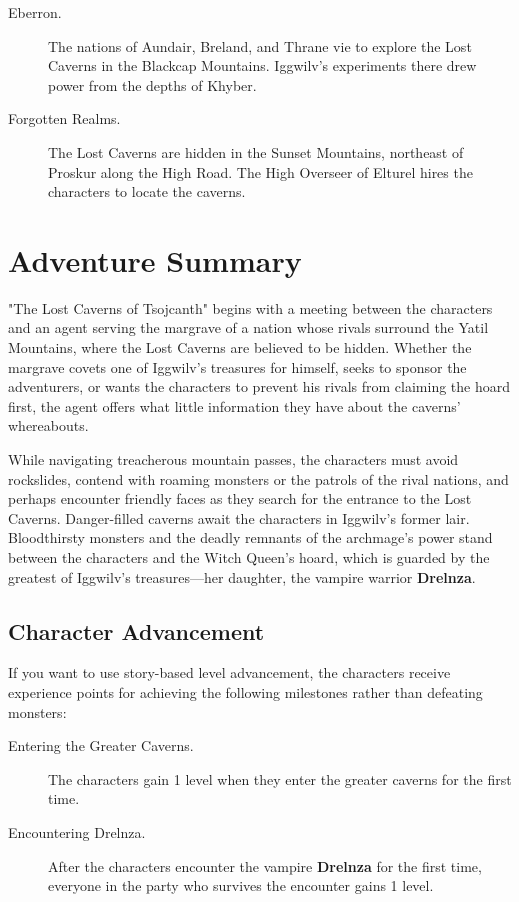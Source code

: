 \documentclass[10pt,a4paper,twoside,bg=print,twocolumn,openany,nodeprecatedcode]{dndbook}
\begin{document}
\begin{description}
\item[Eberron.]
The nations of Aundair, Breland, and Thrane vie to explore the Lost Caverns in the Blackcap Mountains. Iggwilv's experiments there drew power from the depths of Khyber.
\item[Forgotten Realms.]
The Lost Caverns are hidden in the Sunset Mountains, northeast of Proskur along the High Road. The High Overseer of Elturel hires the characters to locate the caverns.
\end{description}

\section{Adventure Summary}
"The Lost Caverns of Tsojcanth" begins with a meeting between the characters and an agent serving the margrave of a nation whose rivals surround the Yatil Mountains, where the Lost Caverns are believed to be hidden. Whether the margrave covets one of Iggwilv's treasures for himself, seeks to sponsor the adventurers, or wants the characters to prevent his rivals from claiming the hoard first, the agent offers what little information they have about the caverns' whereabouts.

While navigating treacherous mountain passes, the characters must avoid rockslides, contend with roaming monsters or the patrols of the rival nations, and perhaps encounter friendly faces as they search for the entrance to the Lost Caverns. Danger-filled caverns await the characters in Iggwilv's former lair. Bloodthirsty monsters and the deadly remnants of the archmage's power stand between the characters and the Witch Queen's hoard, which is guarded by the greatest of Iggwilv's treasures—her daughter, the vampire warrior \textbf{Drelnza}.

\subsection{Character Advancement}
If you want to use story-based level advancement, the characters receive experience points for achieving the following milestones rather than defeating monsters:


\begin{description}
\item[Entering the Greater Caverns.]
The characters gain 1 level when they enter the greater caverns for the first time.
\item[Encountering Drelnza.]
After the characters encounter the vampire \textbf{Drelnza} for the first time, everyone in the party who survives the encounter gains 1 level.
\end{description}
\end{document}

